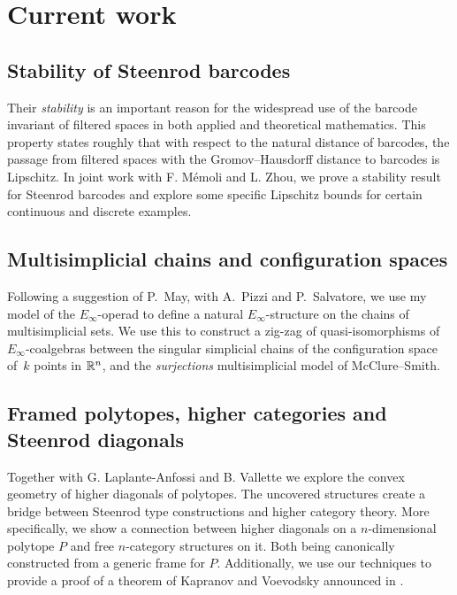 \section{Current work} \label{s:current}

\subsection{Stability of Steenrod barcodes}

Their \textit{stability} is an important reason for the widespread use of the barcode invariant of filtered spaces in both applied and theoretical mathematics.
This property states roughly that with respect to the natural distance of barcodes, the passage from filtered spaces with the Gromov--Hausdorff distance to barcodes is Lipschitz.
In joint work with F. M\'emoli and L. Zhou, we prove a stability result for Steenrod barcodes and explore some specific Lipschitz bounds for certain continuous and discrete examples.

\subsection{Multisimplicial chains and configuration spaces}

Following a suggestion of P.~May, with A.~Pizzi and P.~Salvatore, we use my model of the $E_\infty$-operad to define a natural $E_\infty$-structure on the chains of multisimplicial sets.
We use this to construct a zig-zag of quasi-isomorphisms of $E_\infty$-coalgebras between the singular simplicial chains of the configuration space of~$k$ points in $\mathbb{R}^n$, and the \textit{surjections} multisimplicial model of McClure--Smith.

\subsection{Framed polytopes, higher categories and Steenrod diagonals} \label{ss:polytopes}

Together with G. Laplante-Anfossi and B. Vallette we explore the convex geometry of higher diagonals of polytopes.
The uncovered structures create a bridge between Steenrod type constructions and higher category theory.
More specifically, we show a connection between higher diagonals on a $n$-dimensional polytope $P$ and free $n$-category structures on it.
Both being canonically constructed from a generic frame for $P$.
Additionally, we use our techniques to provide a proof of a theorem of Kapranov and Voevodsky announced in \cite{kapranov1991polycategories}.

